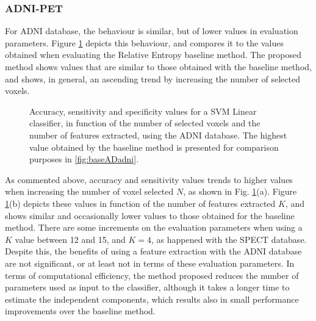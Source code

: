 	\subsubsection{ADNI-PET}
	For ADNI database, the behaviour is similar, but of lower values in evaluation parameters. Figure \ref{fig:icaADNITodos} depicts this behaviour, and compares it to the values obtained when evaluating the Relative Entropy baseline method. The proposed method shows values that are similar to those obtained with the baseline method, and shows, in general, an ascending trend by increasing the number of selected voxels.
	
	
	\begin{figure}[bth]
		\myfloatalign
		 \quad
		\caption{Accuracy, sensitivity and specificity values for a SVM Linear classifier, in function of the number of selected voxels and the number of features extracted, using the ADNI database. The highest value obtained by the baseline method is presented for comparison purposes in \ref{fig:baseADadni}.}
		\label{fig:icaADNITodos}
	\end{figure}
	
	
	As commented above, accuracy and sensitivity values trends to higher values when increasing the number of voxel selected $N$, as shown in Fig. \ref{fig:icaADNITodos}(a). Figure \ref{fig:icaADNITodos}(b) depicts these values in function of the number of features extracted $K$, and shows similar and occasionally lower values to those obtained for the baseline method. There are some increments on the evaluation parameters when using a $K$ value between 12 and 15, and $K=4$, as happened with the SPECT database. Despite this, the benefits of using a feature extraction with the ADNI database are not significant, or at least not in terms of these evaluation parameters. In terms of computational efficiency, the method proposed reduces the number of parameters used as input to the classifier, although it takes a longer time to estimate the independent components, which results also in small performance improvements over the baseline method.  
	
